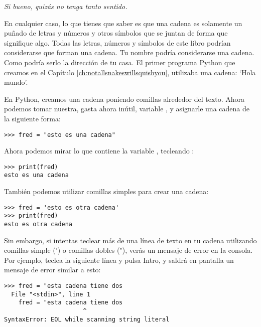 \noindent
\emph{Si bueno, quizás no tenga tanto sentido.}

En cualquier caso, lo que tienes que saber es que una cadena es solamente un puñado de letras y números y otros símbolos que se juntan de forma que signifique algo. Todas las letras, números y símbolos de este libro podrían considerarse que forman una cadena. Tu nombre podría considerarse una cadena. Como podría serlo la dirección de tu casa.  El primer programa Python que creamos en el Capítulo \ref{ch:notallsnakeswillsquishyou}, utilizaba una cadena: `Hola mundo'.
\par
En Python, creamos una cadena poniendo comillas alrededor del texto. Ahora podemos tomar nuestra, gasta ahora inútil, variable , y asignarle una cadena de la siguiente forma:

\begin{listing}
\begin{verbatim}
>>> fred = "esto es una cadena"
\end{verbatim}
\end{listing}

\noindent
Ahora podemos mirar lo que contiene la variable , tecleando :

\begin{listing}
\begin{verbatim}
>>> print(fred)
esto es una cadena
\end{verbatim}
\end{listing}

\noindent
También podemos utilizar comillas simples para crear una cadena:

\begin{listing}
\begin{verbatim}
>>> fred = 'esto es otra cadena'
>>> print(fred)
esto es otra cadena
\end{verbatim}
\end{listing}

Sin embargo, si intentas teclear más de una línea de texto en tu cadena utilizando comillas simple (') o comillas dobles ("), verás un mensaje de error en la consola. Por ejemplo, teclea la siguiente línea y pulsa Intro, y saldrá en pantalla un mensaje de error similar a esto:

\begin{listing}
\begin{verbatim}
>>> fred = "esta cadena tiene dos
  File "<stdin>", line 1
    fred = "esta cadena tiene dos
                      ^
SyntaxError: EOL while scanning string literal
\end{verbatim}
\end{listing}


